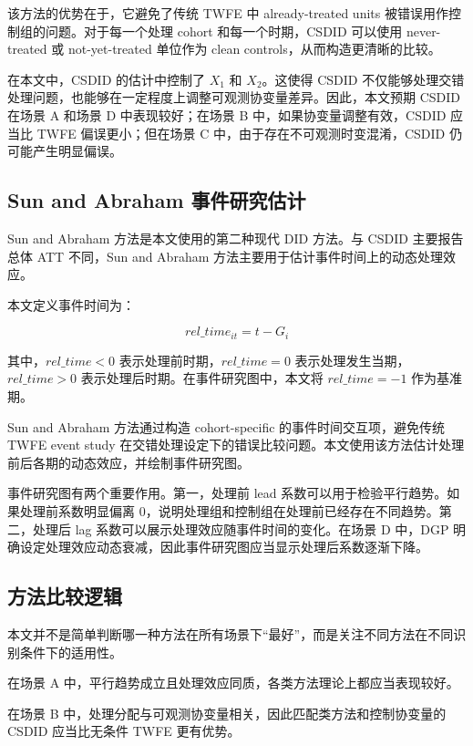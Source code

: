 \documentclass[
  fontset=windows]{ctexart}
\begin{document}
该方法的优势在于，它避免了传统 TWFE 中 already-treated units
被错误用作控制组的问题。对于每一个处理 cohort 和每一个时期，CSDID
可以使用 never-treated 或 not-yet-treated 单位作为 clean
controls，从而构造更清晰的比较。

在本文中，CSDID 的估计中控制了 \(X_1\) 和 \(X_2\)。这使得 CSDID
不仅能够处理交错处理问题，也能够在一定程度上调整可观测协变量差异。因此，本文预期
CSDID 在场景 A 和场景 D 中表现较好；在场景 B
中，如果协变量调整有效，CSDID 应当比 TWFE 偏误更小；但在场景 C
中，由于存在不可观测时变混淆，CSDID 仍可能产生明显偏误。

\subsection{Sun and Abraham
事件研究估计}\label{sun-and-abraham-ux4e8bux4ef6ux7814ux7a76ux4f30ux8ba1}

Sun and Abraham 方法是本文使用的第二种现代 DID 方法。与 CSDID
主要报告总体 ATT 不同，Sun and Abraham
方法主要用于估计事件时间上的动态处理效应。

本文定义事件时间为：

\[
rel\_time_{it}=t-G_i
\]

其中，\(rel\_time<0\) 表示处理前时期，\(rel\_time=0\)
表示处理发生当期，\(rel\_time>0\) 表示处理后时期。在事件研究图中，本文将
\(rel\_time=-1\) 作为基准期。

Sun and Abraham 方法通过构造 cohort-specific 的事件时间交互项，避免传统
TWFE event study
在交错处理设定下的错误比较问题。本文使用该方法估计处理前后各期的动态效应，并绘制事件研究图。

事件研究图有两个重要作用。第一，处理前 lead
系数可以用于检验平行趋势。如果处理前系数明显偏离
0，说明处理组和控制组在处理前已经存在不同趋势。第二，处理后 lag
系数可以展示处理效应随事件时间的变化。在场景 D 中，DGP
明确设定处理效应动态衰减，因此事件研究图应当显示处理后系数逐渐下降。

\subsection{方法比较逻辑}\label{ux65b9ux6cd5ux6bd4ux8f83ux903bux8f91}

本文并不是简单判断哪一种方法在所有场景下``最好''，而是关注不同方法在不同识别条件下的适用性。

在场景 A 中，平行趋势成立且处理效应同质，各类方法理论上都应当表现较好。

在场景 B 中，处理分配与可观测协变量相关，因此匹配类方法和控制协变量的
CSDID 应当比无条件 TWFE 更有优势。
\end{document}
